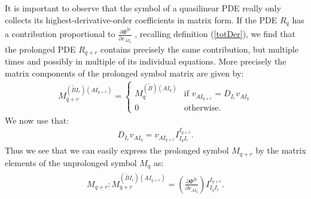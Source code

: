 It is important to observe that the symbol of a quasilinear PDE really only collects its highest-derivative-order coefficients in matrix form.
If the PDE $R_q$ has a contribution proportional to $\frac{\partial \Phi^{\tilde{B}}}{\partial v_{AI_q}}$ , recalling definition (\ref{totDer}), we find that the prolonged PDE $R_{q+r}$ contains precisely the same contribution, but multiple times and possibly in multiple of its individual equations. 
More precisely the matrix components of the prolonged symbol matrix are given by:
\begin{align}
M_{q+r}^{(\tilde{B}I_r) (AI_{q+r})} = 
\begin{cases}
M_q^{(\tilde{B}) (AI_q)}  & \text{if \ \ }  
    v_{AI_{q+r}} = D_{I_r} v_{AI_q} \\
0 & \text{otherwise}.
\end{cases}
\end{align} 
We now use that: 
\begin{align}
    D_{I_r}v_{AI_q} = v_{AI_{q+r}}I_{I_q I_r}^{I_{q+r}}.
\end{align}
Thus we see that we can easily express the prolonged symbol $M_{q+r}$ by the matrix elements of the unprolonged symbol $M_q$ as:
\begin{align}
    \begin{aligned}
    M_{q+r} : M_{q+r} ^{(\tilde{B}I_r) (AI_{q+r})}  = \left ( \frac{\partial \Phi^{\tilde{B}}}{\partial v_{AI_q}} \right ) I_{I_q I_r}^{I_{q+r}} .
    \end{aligned}
\end{align}

